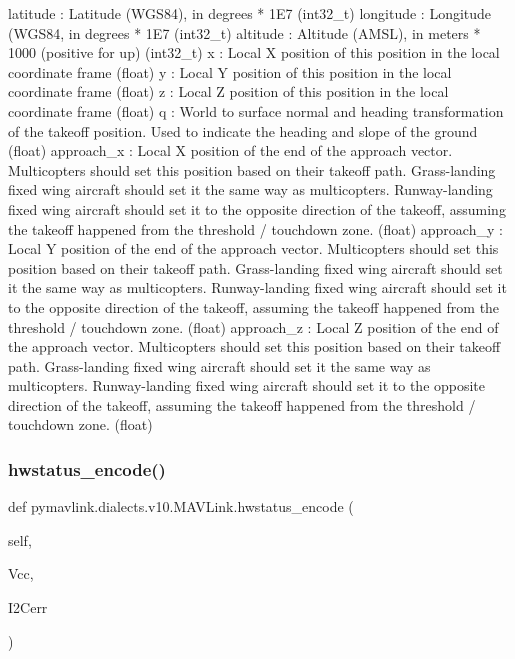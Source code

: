 \begin{DoxyVerb}
\begin{DoxyVerb}
\begin{DoxyVerb}
\begin{DoxyVerb}
\begin{DoxyVerb}
latitude                  : Latitude (WGS84), in degrees * 1E7 (int32_t)
longitude                 : Longitude (WGS84, in degrees * 1E7 (int32_t)
altitude                  : Altitude (AMSL), in meters * 1000 (positive for up) (int32_t)
x                         : Local X position of this position in the local coordinate frame (float)
y                         : Local Y position of this position in the local coordinate frame (float)
z                         : Local Z position of this position in the local coordinate frame (float)
q                         : World to surface normal and heading transformation of the takeoff position. Used to indicate the heading and slope of the ground (float)
approach_x                : Local X position of the end of the approach vector. Multicopters should set this position based on their takeoff path. Grass-landing fixed wing aircraft should set it the same way as multicopters. Runway-landing fixed wing aircraft should set it to the opposite direction of the takeoff, assuming the takeoff happened from the threshold / touchdown zone. (float)
approach_y                : Local Y position of the end of the approach vector. Multicopters should set this position based on their takeoff path. Grass-landing fixed wing aircraft should set it the same way as multicopters. Runway-landing fixed wing aircraft should set it to the opposite direction of the takeoff, assuming the takeoff happened from the threshold / touchdown zone. (float)
approach_z                : Local Z position of the end of the approach vector. Multicopters should set this position based on their takeoff path. Grass-landing fixed wing aircraft should set it the same way as multicopters. Runway-landing fixed wing aircraft should set it to the opposite direction of the takeoff, assuming the takeoff happened from the threshold / touchdown zone. (float)\end{DoxyVerb}
 \mbox{\label{classpymavlink_1_1dialects_1_1v10_1_1MAVLink_aa6983e5a32446891993c593d116c0f22}} 
\subsubsection{\texorpdfstring{hwstatus\+\_\+encode()}{hwstatus\_encode()}}
{\footnotesize\ttfamily def pymavlink.\+dialects.\+v10.\+M\+A\+V\+Link.\+hwstatus\+\_\+encode (\begin{DoxyParamCaption}\item[{}]{self,  }\item[{}]{Vcc,  }\item[{}]{I2\+Cerr }\end{DoxyParamCaption})}


\end{DoxyVerb}
\end{DoxyVerb}
\end{DoxyVerb}
\end{DoxyVerb}
